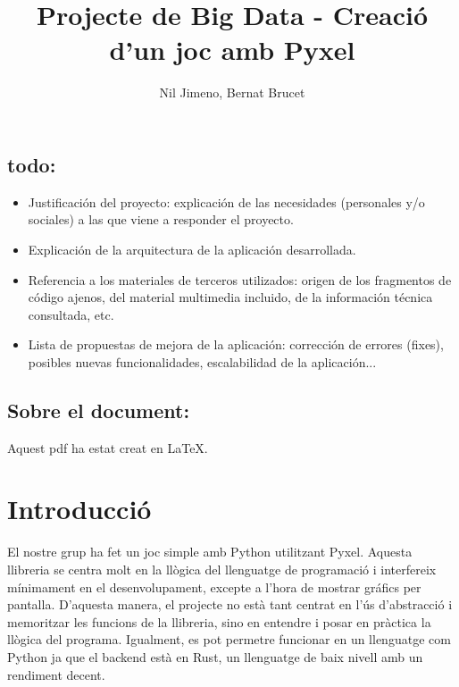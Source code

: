 

\title{Projecte de Big Data - Creaci\'o d'un joc amb Pyxel}
\author{Nil Jimeno, Bernat Brucet}


\maketitle

\subsection*{todo:}
\begin{itemize}
	\item{Justificación del proyecto: explicación de las necesidades (personales y/o
		sociales) a las que viene a responder el proyecto.}
	\item{Explicación de la arquitectura de la aplicación desarrollada.}
	\item{Referencia a los materiales de terceros utilizados: origen de los fragmentos de
		código ajenos, del material multimedia incluido, de la información técnica
		consultada, etc.}
	\item{Lista de propuestas de mejora de la aplicación: corrección de errores (fixes),
		posibles nuevas funcionalidades, escalabilidad de la aplicación...}
\end{itemize}

\subsection*{Sobre el document:}

Aquest pdf ha estat creat en \LaTeX.

\section{Introducci\'o}
El nostre grup ha fet un joc simple amb Python utilitzant Pyxel.
Aquesta llibreria se centra molt en la ll\`ogica del llenguatge de programaci\'o
i interfereix m\'inimament en el desenvolupament,
excepte a l'hora de mostrar gr\'afics per pantalla.
D'aquesta manera, el projecte no est\`a tant centrat en l'\'us d'abstracci\'o
i memoritzar les funcions de la llibreria,
sino en entendre i posar en pr\`actica la ll\`ogica del programa.
Igualment, es pot permetre funcionar en un llenguatge com Python
ja que el backend est\`a en Rust,
un llenguatge de baix nivell amb un rendiment decent.



